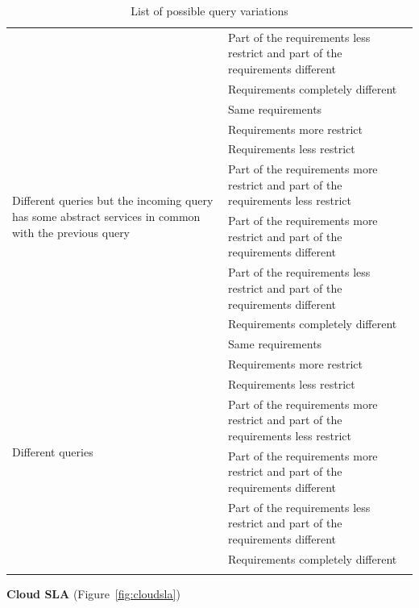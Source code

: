 \documentclass[12pt,a4paper,oneside]{article}
\theoremstyle{definition}
\begin{document}
\begin{center}
\begin{longtable}{|l|p{8cm}|}
                  & Part of the requirements less restrict and part of the requirements different \\ \cline{2-2} 
                  & Requirements completely different \\ \hline
\multirow{7}{6cm}{Different queries but the incoming query has some abstract services in common with the previous query}  & Same requirements \\ \cline{2-2} 
                  & Requirements more restrict \\ \cline{2-2} 
                  & Requirements less restrict \\ \cline{2-2} 
                  & Part of the requirements more restrict and part of the requirements less restrict \\ \cline{2-2} 
                  & Part of the requirements more restrict and part of the requirements different \\ \cline{2-2} 
                  & Part of the requirements less restrict and part of the requirements different \\ \cline{2-2} 
                  & Requirements completely different \\ \hline
\multirow{7}{6cm}{Different queries} & Same requirements \\ \cline{2-2} 
                  & Requirements more restrict \\ \cline{2-2} 
                  & Requirements less restrict \\ \cline{2-2} 
                  & Part of the requirements more restrict and part of the requirements less restrict \\ \cline{2-2} 
                  & Part of the requirements more restrict and part of the requirements different \\ \cline{2-2} 
                  & Part of the requirements less restrict and part of the requirements different \\ \cline{2-2} 
                  & Requirements completely different \\ \hline
\caption{List of possible query variations\label{tab:big}} \\
\end{longtable}%
\end{center}

\begin{flushleft}
\textbf{Cloud SLA} (Figure~\ref{fig:cloudsla})
\end{flushleft}
\end{document}
